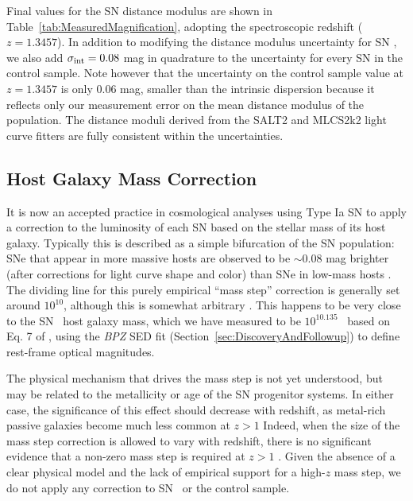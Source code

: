 Final values for the SN distance modulus are shown in
Table~\ref{tab:MeasuredMagnification}, adopting the spectroscopic
redshift ($z=1.3457$).  In addition to modifying the distance modulus
uncertainty for SN \tomas, we also add $\sigma_{\rm int}=0.08$ mag in
quadrature to the uncertainty for every SN in the control sample. Note
however that the uncertainty on the control sample value at $z=1.3457$
is only 0.06 mag, smaller than the intrinsic dispersion because it
reflects only our measurement error on the mean distance modulus of
the population.  The distance moduli derived from the SALT2 and
MLCS2k2 light curve fitters are fully consistent within the
uncertainties. 

\subsection{Host Galaxy Mass Correction}
\label{sec:HostGalaxyMassCorrection}

It is now an accepted practice in cosmological analyses using Type Ia
SN to apply a correction to the luminosity of each SN based on the
stellar mass of its host galaxy. Typically this is described as a
simple bifurcation of the SN population: SNe that appear in more
massive hosts are observed to be $\sim$0.08 mag brighter (after
corrections for light curve shape and color) than SNe in low-mass
hosts \citep{Kelly:2010,Sullivan:2010}.  The dividing line for this
purely empirical ``mass step'' correction is generally set around
$10^{10}$\Msun, although this is somewhat arbitrary \citep[see
e.g.][]{Betoule:2014}.  This happens to be very close to the
SN \tomas\ host galaxy mass, which we have measured to be
$10^{10.135}$ \Msun\ based on Eq. 7 of \citet{Taylor:2011}, using the
{\it BPZ} SED fit (Section~\ref{sec:DiscoveryAndFollowup}) to define rest-frame optical magnitudes.


The physical mechanism that drives the mass step is not yet
understood, but may be related to the metallicity or age of the SN
progenitor systems.  In either case, the significance of this effect
should decrease with redshift, as metal-rich passive galaxies become
much less common at $z>1$   Indeed, when the size of the
mass step correction is allowed to vary with redshift, there is no
significant evidence that a non-zero mass step is required at
$z>1$ \citep{Rigault:2013,Shafer:2014,Betoule:2014}.  Given the
absence of a clear physical model and the lack of empirical support
for a high-$z$ mass step, we do not apply any correction to SN \tomas\
or the control sample.


